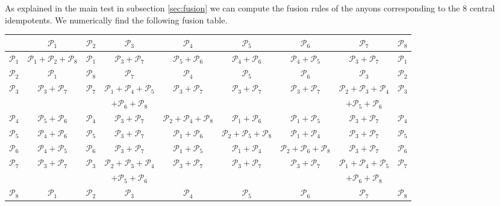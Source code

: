 \documentclass[12 pt]{article}
\begin{document}
As explained in the main test in subsection \ref{sec:fusion} we can compute the fusion rules of the anyons corresponding to the 8 central idempotents.
We numerically find the following fusion table.
\footnotesize
\begin{center}
  \begin{tabular}{ c || c | c | c | c | c | c | c | c |}
     	   & $\mathcal{P}_1$ & $\mathcal{P}_2$ & $\mathcal{P}_3$ & $\mathcal{P}_4$ & $\mathcal{P}_5$ & $\mathcal{P}_6$ & $\mathcal{P}_7$ & $\mathcal{P}_8$ \\ \hline \hline
     $\mathcal{P}_1$ & $\mathcal{P}_1+\mathcal{P}_2+\mathcal{P}_8$ & $\mathcal{P}_1$ & $\mathcal{P}_3+\mathcal{P}_7$ & $\mathcal{P}_5+\mathcal{P}_6$ & $\mathcal{P}_4+\mathcal{P}_6$ & $\mathcal{P}_4+\mathcal{P}_5$ & $\mathcal{P}_3+\mathcal{P}_7$ & $\mathcal{P}_1$ \\ \hline
     $\mathcal{P}_2$ & $\mathcal{P}_1$ & $\mathcal{P}_8$ & $\mathcal{P}_7$ & $\mathcal{P}_4$ & $\mathcal{P}_5$ & $\mathcal{P}_6$ & $\mathcal{P}_3$ & $\mathcal{P}_2$ \\ \hline
	 $\mathcal{P}_3$ & $\mathcal{P}_3+\mathcal{P}_7$ & $\mathcal{P}_7$ & $\mathcal{P}_1+\mathcal{P}_4+\mathcal{P}_5$ & $\mathcal{P}_3+\mathcal{P}_7$ & $\mathcal{P}_3+\mathcal{P}_7$ & $\mathcal{P}_3+\mathcal{P}_7$ & $\mathcal{P}_2+\mathcal{P}_3+\mathcal{P}_4$ & $\mathcal{P}_3$\\
	       &           &       & $+\mathcal{P}_6+\mathcal{P}_8$     &           &           &           & $+\mathcal{P}_5+\mathcal{P}_6$     &  \\ \hline
	 $\mathcal{P}_4$ & $\mathcal{P}_5+\mathcal{P}_6$ & $\mathcal{P}_4$ & $\mathcal{P}_3+\mathcal{P}_7$ & $\mathcal{P}_2+\mathcal{P}_4+\mathcal{P}_8$ & $\mathcal{P}_1+\mathcal{P}_6$ & $\mathcal{P}_1+\mathcal{P}_5$ & $\mathcal{P}_3+\mathcal{P}_7$ & $\mathcal{P}_4$\\ \hline
	 $\mathcal{P}_5$ & $\mathcal{P}_4+\mathcal{P}_6$ & $\mathcal{P}_5$ & $\mathcal{P}_3+\mathcal{P}_7$ & $\mathcal{P}_1+\mathcal{P}_6$ & $\mathcal{P}_2+\mathcal{P}_5+\mathcal{P}_8$ & $\mathcal{P}_1+\mathcal{P}_4$ & $\mathcal{P}_3+\mathcal{P}_7$ & $\mathcal{P}_5$\\  \hline
	 $\mathcal{P}_6$ & $\mathcal{P}_4+\mathcal{P}_5$ & $\mathcal{P}_6$ & $\mathcal{P}_3+\mathcal{P}_7$ & $\mathcal{P}_1+\mathcal{P}_5$ & $\mathcal{P}_1+\mathcal{P}_4$ & $\mathcal{P}_2+\mathcal{P}_6+\mathcal{P}_8$ & $\mathcal{P}_3+\mathcal{P}_7$ & $\mathcal{P}_6$\\  \hline
	 $\mathcal{P}_7$ & $\mathcal{P}_3+\mathcal{P}_7$ & $\mathcal{P}_3$ & $\mathcal{P}_2+\mathcal{P}_3+\mathcal{P}_4$ & $\mathcal{P}_3+\mathcal{P}_7$ & $\mathcal{P}_3+\mathcal{P}_7$ & $\mathcal{P}_3+\mathcal{P}_7$ & $\mathcal{P}_1+\mathcal{P}_4+\mathcal{P}_5$  & $\mathcal{P}_7$\\
	       &           &       & $+\mathcal{P}_5+\mathcal{P}_6$     &           &           &           & $+\mathcal{P}_6+\mathcal{P}_8$     &  \\ \hline
	 $\mathcal{P}_8$ & $\mathcal{P}_1$ & $\mathcal{P}_2$ & $\mathcal{P}_3$ & $\mathcal{P}_4$ & $\mathcal{P}_5$ & $\mathcal{P}_6$ & $\mathcal{P}_7$  & $\mathcal{P}_8$\\


\end{tabular}
\end{center}
\end{document}
